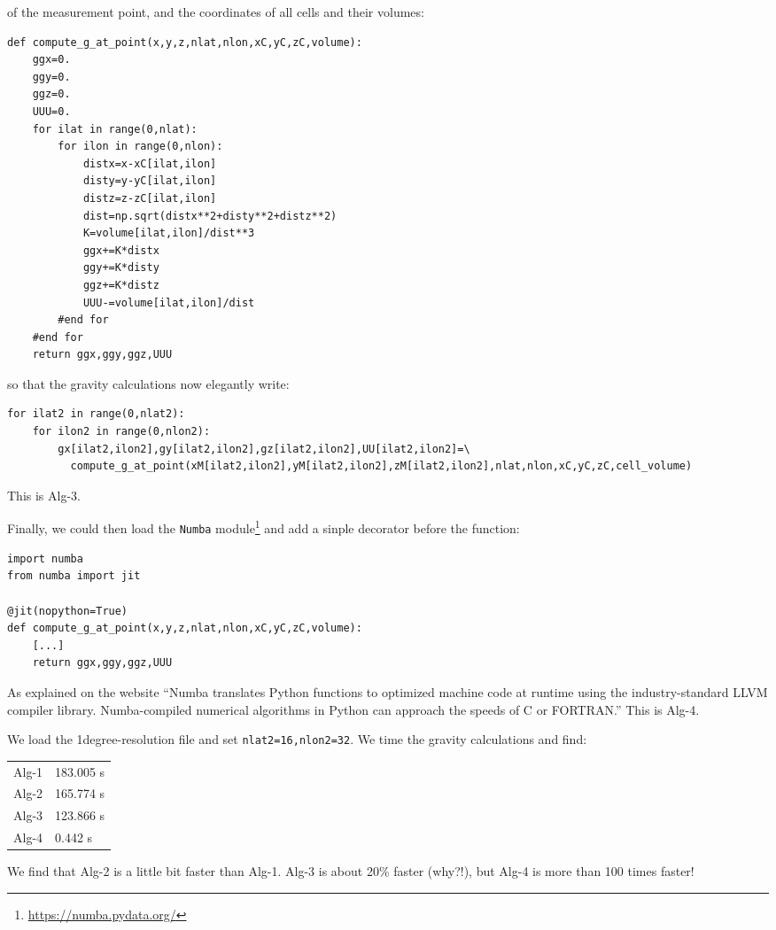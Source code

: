 of the measurement point, and the coordinates of all cells and their volumes:
\begin{lstlisting}
def compute_g_at_point(x,y,z,nlat,nlon,xC,yC,zC,volume):
    ggx=0.
    ggy=0.
    ggz=0.
    UUU=0.
    for ilat in range(0,nlat):
        for ilon in range(0,nlon):
            distx=x-xC[ilat,ilon]
            disty=y-yC[ilat,ilon]
            distz=z-zC[ilat,ilon]
            dist=np.sqrt(distx**2+disty**2+distz**2)
            K=volume[ilat,ilon]/dist**3
            ggx+=K*distx
            ggy+=K*disty
            ggz+=K*distz
            UUU-=volume[ilat,ilon]/dist
        #end for
    #end for
    return ggx,ggy,ggz,UUU
\end{lstlisting}
so that the gravity calculations now elegantly write:
\begin{lstlisting}
for ilat2 in range(0,nlat2):
    for ilon2 in range(0,nlon2): 
        gx[ilat2,ilon2],gy[ilat2,ilon2],gz[ilat2,ilon2],UU[ilat2,ilon2]=\
          compute_g_at_point(xM[ilat2,ilon2],yM[ilat2,ilon2],zM[ilat2,ilon2],nlat,nlon,xC,yC,zC,cell_volume)
\end{lstlisting}
This is Alg-3.

Finally, we could then load the \lstinline{Numba} module\footnote{\url{https://numba.pydata.org/}} 
and add a sinple decorator before the 
function:
\begin{lstlisting}
import numba
from numba import jit

@jit(nopython=True)
def compute_g_at_point(x,y,z,nlat,nlon,xC,yC,zC,volume):
    [...]
    return ggx,ggy,ggz,UUU
\end{lstlisting}
As explained on the website ``Numba translates Python functions to optimized machine code at runtime using 
the industry-standard LLVM compiler library. Numba-compiled numerical algorithms in Python 
can approach the speeds of C or FORTRAN.''
This is Alg-4.

We load the 1degree-resolution file and set \lstinline{nlat2=16,nlon2=32}. We time the 
gravity calculations and find:
\begin{center}
\begin{tabular}{ll}
\hline
Alg-1 & 183.005 s \\
Alg-2 & 165.774 s \\ 
Alg-3 & 123.866 s \\
Alg-4 & 0.442 s \\
\hline
\end{tabular}
\end{center}
We find that Alg-2 is a little bit faster than Alg-1. Alg-3 is about 20\% faster (why?!), 
but Alg-4 is more than 100 times faster!  

